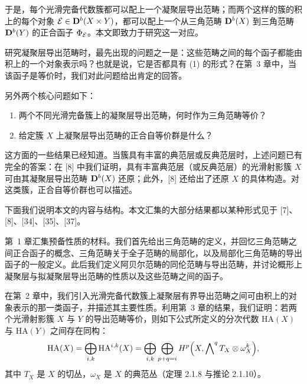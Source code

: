 
于是，每个光滑完备代数簇都可以配上一个凝聚层导出范畴；而两个这样的簇的积上的每个对象 $\mathcal{E}\in\mathbf{D}^{b}(X\times Y)$，都可以配上一个从三角范畴 $\mathbf{D}^{b}(X)$ 到三角范畴 $\mathbf{D}^{b}(Y)$ 的正合函子 $\Phi_{\mathcal{E}}$。本文即致力于研究这一对应。

研究凝聚层导出范畴时，最先出现的问题之一是：这些范畴之间的每个函子都能由积上的一个对象表示吗？也就是说，它是否都具有 (1) 的形式？在第~3 章中，当该函子是等价时，我们对此问题给出肯定的回答。

另外两个核心问题如下：
\begin{enumerate}[label=\arabic*),leftmargin=2.4em,itemsep=2pt,topsep=2pt]
\item 两个不同光滑完备簇上的凝聚层导出范畴，何时作为三角范畴等价？
\item 给定簇 $X$ 上凝聚层导出范畴的正合自等价群是什么？
\end{enumerate}

这方面的一些结果已经知道。当簇具有丰富的典范层或反典范层时，上述问题已有完全的答案：在 [8] 中我们证明，具有丰富典范层（或反典范层）的光滑射影簇 $X$ 可由其凝聚层导出范畴 $\mathbf{D}^{b}(X)$ 还原；此外，[8] 还给出了还原 $X$ 的具体构造。对这类簇，正合自等价群也可以描述。

下面我们说明本文的内容与结构。本文汇集的大部分结果都以某种形式见于 [7]、[8]、[34]、[35]、[37]。

第~1 章汇集预备性质的材料。我们首先给出三角范畴的定义，并回忆三角范畴之间正合函子的概念、三角范畴关于全子范畴的局部化，以及局部化三角范畴的导出函子的一般定义。此后我们定义阿贝尔范畴的同伦范畴与导出范畴，并讨论概形上凝聚层与拟凝聚层导出范畴的性质以及这些范畴之间的函子。

在第~2 章中，我们引入光滑完备代数簇上凝聚层有界导出范畴之间可由积上的对象表示的那一类函子，并描述其主要性质。利用第~3 章的结果，我们证明：若两个光滑射影簇 $X$ 与 $Y$ 的导出范畴等价，则如下公式所定义的分次代数 $\mathrm{HA}(X)$ 与 $\mathrm{HA}(Y)$ 之间存在同构：
\begin{equation*}
\mathrm{HA}(X)=\bigoplus_{i,k}\mathrm{HA}^{i,k}(X)
=\bigoplus_{i,k}\bigoplus_{p+q=i}H^{p}\Bigl(X,\bigwedge\nolimits^{q}T_X\otimes\omega_X^{k}\Bigr),
\end{equation*}
其中 $T_X$ 是 $X$ 的切丛，$\omega_X$ 是 $X$ 的典范丛（定理 2.1.8 与推论 2.1.10）。

